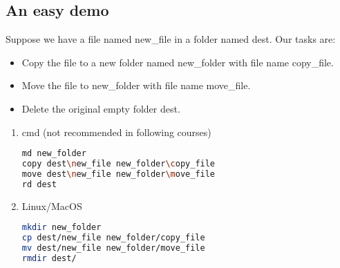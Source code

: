 \documentclass[11pt]{exam}
\begin{document}
\subsection{An easy demo}
Suppose we have a file named new\_file in a folder named dest.
Our tasks are:
\begin{itemize}
    \item Copy the file to a new folder named new\_folder with file name copy\_file.
    \item Move the file to new\_folder with file name move\_file.
    \item Delete the original empty folder dest.
\end{itemize}
\begin{enumerate}
\item cmd (not recommended in following courses)
\begin{lstlisting}[language={sh}]
md new_folder
copy dest\new_file new_folder\copy_file
move dest\new_file new_folder\move_file
rd dest
\end{lstlisting}  
\item Linux/MacOS
\begin{lstlisting}[language={sh}]
mkdir new_folder
cp dest/new_file new_folder/copy_file
mv dest/new_file new_folder/move_file
rmdir dest/
\end{lstlisting}  
\end{enumerate}
\end{document}
